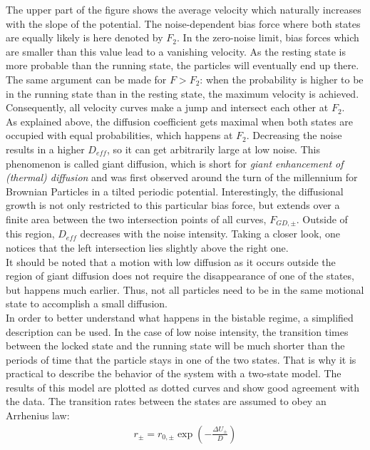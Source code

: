 \documentclass[12pt,a4paper]{article}
\begin{document}
The upper part of the figure shows the average velocity which naturally increases with the slope of the potential. The noise-dependent bias force where both states are equally likely is here denoted by $F_2$. In the zero-noise limit, bias forces which are smaller than this value lead to a vanishing velocity. As the resting state is more probable than the running state, the particles will eventually end up there. The same argument can be made for $F>F_2$: when the probability is higher to be in the running state than in the resting state, the maximum velocity is achieved. Consequently, all velocity curves make a jump and intersect each other at $F_2$.\\
As explained above, the diffusion coefficient gets maximal when both states are occupied with equal probabilities, which happens at $F_2$. Decreasing the noise results in a higher $D_{eff}$, so it can get arbitrarily large at low noise. This phenomenon is called giant diffusion, which is short for \textit{giant enhancement of (thermal) diffusion} and was first observed around the turn of the millennium for Brownian Particles in a tilted periodic potential\cite{td}\cite{ga}\cite{dit}\cite{gd}. %
Interestingly, the diffusional growth is not only restricted to this particular bias force, but extends over a finite area between the two intersection points of all curves, $F_{GD,\pm}$. Outside of this region, $D_{eff}$ decreases with the noise intensity. Taking a closer look, one notices that the left intersection lies slightly above the right one. \\
It should be noted that a motion with low diffusion as it occurs outside the region of giant diffusion does not require the disappearance of one of the states, but happens much earlier. Thus, not all particles need to be in the same motional state to accomplish a small diffusion.\\
In order to better understand what happens in the bistable regime, a simplified description can be used. 
In the case of low noise intensity, the transition times between the locked state and the running state will be much shorter than the periods of time that the particle stays in one of the two states. That is why it is practical to describe the behavior of the system with a two-state model. The results of this model are plotted as dotted curves and show good agreement with the data. The transition rates between the states are assumed to obey an Arrhenius law:
\begin{align}\label{arrhlaw}
r_{\pm}=r_{0,\pm}\exp\left(-\frac{\Delta U_{\pm}}{D}\right)
\end{align}
\end{document}
